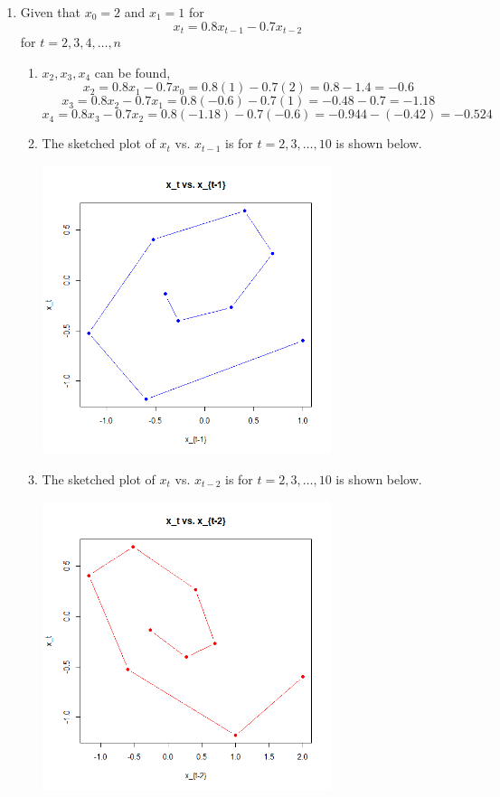 \documentclass[12pt]{article}
\begin{document}
\begin{enumerate}
    \item Given that $x_0 = 2$ and $x_1 = 1$ for
    \[ x_t = 0.8x_{t-1} - 0.7x_{t-2} \]
    for $t = 2, 3, 4, \ldots, n$
    \begin{enumerate}
        \item $x_2, x_3, x_4$ can be found,
        \[ 
        x_2 = 0.8x_1 - 0.7x_0 = 0.8(1) - 0.7(2) 
        = 0.8 - 1.4 = -0.6
        \]
        \[
        x_3 = 0.8x_2 - 0.7x_1 = 0.8(-0.6) - 0.7(1)
        = -0.48 - 0.7 = -1.18
        \]
        \[
        x_4 = 0.8x_3 - 0.7x_2 = 0.8(-1.18) - 0.7(-0.6)
        = -0.944 - (-0.42) = -0.524
        \]
        \item The sketched plot of $x_t$ vs. $x_{t-1}$ is
        for $t = 2, 3, \ldots, 10$ is shown below.
        \begin{center}
            \includegraphics[width=0.7\textwidth]{Rplot10.png}
        \end{center}
        \item The sketched plot of $x_t$ vs. $x_{t-2}$ is
        for $t = 2, 3, \ldots, 10$ is shown below.
        \begin{center}
            \includegraphics[width=0.7\textwidth]{Rplot11.png}

\end{center}
\end{enumerate}
\end{enumerate}
\end{document}
